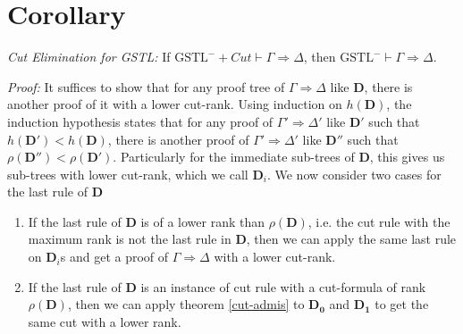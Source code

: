\documentclass[a4paper, 12pt]{paper}
\begin{document}
\section{Corollary} \emph{Cut Elimination for GSTL: }
If $\text{GSTL}^- + Cut \vdash \Gamma \Rightarrow \Delta$, then $\text{GSTL}^- \vdash \Gamma \Rightarrow \Delta$.

\emph{Proof:} It suffices to show that for any proof tree of $\Gamma \Rightarrow \Delta$ like $\mathbf{D}$, there is another proof of it with a lower cut-rank. Using induction on $h(\mathbf{D})$, the induction hypothesis states that for any proof of $\Gamma' \Rightarrow \Delta'$ like $\mathbf{D'}$ such that $h(\mathbf{D'}) < h(\mathbf{D})$, there is another proof of $\Gamma' \Rightarrow \Delta'$ like $\mathbf{D''}$ such that $\rho(\mathbf{D''}) < \rho(\mathbf{D'})$. Particularly for the immediate sub-trees of $\mathbf{D}$, this gives us sub-trees with lower cut-rank, which we call $\mathbf{D}_i$. We now consider two cases for the last rule of $\mathbf{D}$

\begin{enumerate}[label=\Roman*]
	\item If the last rule of $\mathbf{D}$ is of a lower rank than $\rho(\mathbf{D})$, i.e. the cut rule with the maximum rank is not the last rule in $\mathbf{D}$, then we can apply the same last rule on $\mathbf{D}_i$s and get a proof of $\Gamma \Rightarrow \Delta$ with a lower cut-rank.
	
	\item If the last rule of $\mathbf{D}$ is an instance of cut rule with a cut-formula of rank $\rho(\mathbf{D})$, then we can apply theorem \ref{cut-admis} to $\mathbf{D_0}$ and $\mathbf{D_1}$ to get the same cut with a lower rank.
\end{enumerate}
\end{document}

